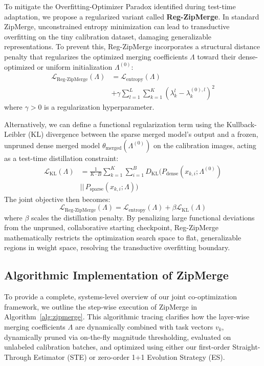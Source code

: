 To mitigate the Overfitting-Optimizer Paradox identified during test-time adaptation, we propose a regularized variant called \textbf{Reg-ZipMerge}. In standard ZipMerge, unconstrained entropy minimization can lead to transductive overfitting on the tiny calibration dataset, damaging generalizable representations. To prevent this, Reg-ZipMerge incorporates a structural distance penalty that regularizes the optimized merging coefficients $\Lambda$ toward their dense-optimized or uniform initialization $\Lambda^{(0)}$:
\begin{equation}
\begin{aligned}
    \mathcal{L}_{\text{Reg-ZipMerge}}(\Lambda) &= \mathcal{L}_{\text{entropy}}(\Lambda) \\
    &+ \gamma \sum_{l=1}^L \sum_{k=1}^K \left( \lambda^l_k - \lambda^{(0), l}_k \right)^2
\end{aligned}
\end{equation}
where $\gamma > 0$ is a regularization hyperparameter.

Alternatively, we can define a functional regularization term using the Kullback-Leibler (KL) divergence between the sparse merged model's output and a frozen, unpruned dense merged model $\theta_{\text{merged}}(\Lambda^{(0)})$ on the calibration images, acting as a test-time distillation constraint:
\begin{equation}
\begin{aligned}
    \mathcal{L}_{\text{KL}}(\Lambda) &= \frac{1}{K \cdot B} \sum_{k=1}^K \sum_{i=1}^B D_{\text{KL}}\Big( P_{\text{dense}}\left(x_{k,i}; \Lambda^{(0)}\right) \\
    &||\, P_{\text{sparse}}\left(x_{k,i}; \Lambda\right) \Big)
\end{aligned}
\end{equation}
The joint objective then becomes:
\begin{equation}
    \mathcal{L}_{\text{Reg-ZipMerge}}(\Lambda) = \mathcal{L}_{\text{entropy}}(\Lambda) + \beta \mathcal{L}_{\text{KL}}(\Lambda)
\end{equation}
where $\beta$ scales the distillation penalty. By penalizing large functional deviations from the unpruned, collaborative starting checkpoint, Reg-ZipMerge mathematically restricts the optimization search space to flat, generalizable regions in weight space, resolving the transductive overfitting boundary.

\subsection{Algorithmic Implementation of ZipMerge}
To provide a complete, systems-level overview of our joint co-optimization framework, we outline the step-wise execution of ZipMerge in Algorithm~\ref{alg:zipmerge}. This algorithmic tracing clarifies how the layer-wise merging coefficients $\Lambda$ are dynamically combined with task vectors $v_k$, dynamically pruned via on-the-fly magnitude thresholding, evaluated on unlabeled calibration batches, and optimized using either our first-order Straight-Through Estimator (STE) or zero-order 1+1 Evolution Strategy (ES).

